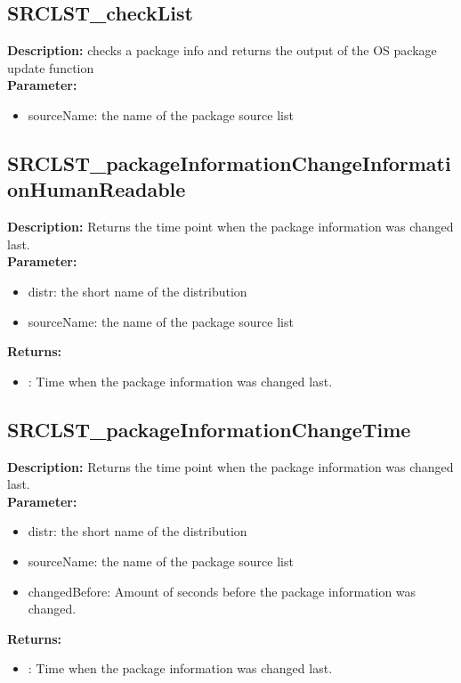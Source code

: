 \subsection{SRCLST\_checkList}
\textbf{Description:} checks a package info and returns the output of the OS package update function\\
\textbf{Parameter:}
\begin{itemize}
\item sourceName: the name of the package source list
\end{itemize}

\subsection{SRCLST\_packageInformationChangeInformationHumanReadable}
\textbf{Description:} Returns the time point when the package information was changed last.\\
\textbf{Parameter:}
\begin{itemize}
\item distr: the short name of the distribution
\item sourceName: the name of the package source list
\end{itemize}
\textbf{Returns:}
\begin{itemize}
\item : Time when the package information was changed last.
\end{itemize}

\subsection{SRCLST\_packageInformationChangeTime}
\textbf{Description:} Returns the time point when the package information was changed last.\\
\textbf{Parameter:}
\begin{itemize}
\item distr: the short name of the distribution
\item sourceName: the name of the package source list
\item changedBefore: Amount of seconds before the package information was changed.
\end{itemize}
\textbf{Returns:}
\begin{itemize}
\item : Time when the package information was changed last.
\end{itemize}

